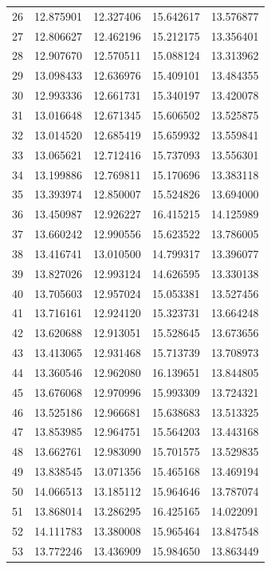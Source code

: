 \begin{table}
\begin{tabular}{rrrrr}
26 & 12.875901 & 12.327406 & 15.642617 & 13.576877 \\
27 & 12.806627 & 12.462196 & 15.212175 & 13.356401 \\
28 & 12.907670 & 12.570511 & 15.088124 & 13.313962 \\
29 & 13.098433 & 12.636976 & 15.409101 & 13.484355 \\
30 & 12.993336 & 12.661731 & 15.340197 & 13.420078 \\
31 & 13.016648 & 12.671345 & 15.606502 & 13.525875 \\
32 & 13.014520 & 12.685419 & 15.659932 & 13.559841 \\
33 & 13.065621 & 12.712416 & 15.737093 & 13.556301 \\
34 & 13.199886 & 12.769811 & 15.170696 & 13.383118 \\
35 & 13.393974 & 12.850007 & 15.524826 & 13.694000 \\
36 & 13.450987 & 12.926227 & 16.415215 & 14.125989 \\
37 & 13.660242 & 12.990556 & 15.623522 & 13.786005 \\
38 & 13.416741 & 13.010500 & 14.799317 & 13.396077 \\
39 & 13.827026 & 12.993124 & 14.626595 & 13.330138 \\
40 & 13.705603 & 12.957024 & 15.053381 & 13.527456 \\
41 & 13.716161 & 12.924120 & 15.323731 & 13.664248 \\
42 & 13.620688 & 12.913051 & 15.528645 & 13.673656 \\
43 & 13.413065 & 12.931468 & 15.713739 & 13.708973 \\
44 & 13.360546 & 12.962080 & 16.139651 & 13.844805 \\
45 & 13.676068 & 12.970996 & 15.993309 & 13.724321 \\
46 & 13.525186 & 12.966681 & 15.638683 & 13.513325 \\
47 & 13.853985 & 12.964751 & 15.564203 & 13.443168 \\
48 & 13.662761 & 12.983090 & 15.701575 & 13.529835 \\
49 & 13.838545 & 13.071356 & 15.465168 & 13.469194 \\
50 & 14.066513 & 13.185112 & 15.964646 & 13.787074 \\
51 & 13.868014 & 13.286295 & 16.425165 & 14.022091 \\
52 & 14.111783 & 13.380008 & 15.965464 & 13.847548 \\
53 & 13.772246 & 13.436909 & 15.984650 & 13.863449 \\

\end{tabular}
\end{table}
